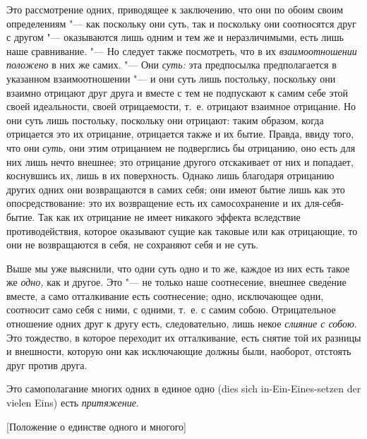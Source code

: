 Это рассмотрение одних, приводящее к заключению, что они по обоим своим
определениям "--- как поскольку они суть, так и поскольку они соотносятся друг
с другом "--- оказываются лишь одним и тем же и неразличимыми, есть лишь наше
сравнивание. "--- Но следует также посмотреть, что в их
{\em взаимоотношении положено} в них же самих. "--- Они
{\em суть:} эта предпосылка предполагается в указанном
взаимоотношении "--- и они суть лишь постольку, поскольку они взаимно отрицают
друг друга и вместе с тем не подпускают к самим себе этой своей
идеальности, своей отрицаемости, т.~е. отрицают взаимное отрицание. Но они
суть лишь постольку, поскольку они отрицают: таким образом, когда
отрицается это их отрицание, отрицается также и их бытие. Правда, ввиду
того, что они {\em суть,} они этим отрицанием не
подверглись бы отрицанию, оно есть для них лишь нечто внешнее; это
отрицание другого отскакивает от них и попадает, коснувшись их, лишь в их
поверхность. Однако лишь благодаря отрицанию других одних они возвращаются
в самих себя; они имеют бытие лишь как это опосредствование: это их
возвращение есть их самосохранение и их для-себя-бытие. Так как их
отрицание не имеет никакого эффекта вследствие противодействия, которое
оказывают сущие как таковые или как отрицающие, то они не возвращаются в
себя, не сохраняют себя и не суть.

Выше мы уже выяснили, что одни суть одно и то же, каждое из них есть такое
же {\em одно,} как и другое. Это "--- не только наше
соотнесение, внешнее свед\'{е}ние вместе, а само отталкивание есть соотнесение;
одно, исключающее одни, соотносит само себя с ними, с одними, т.~е. с самим
собою. Отрицательное отношение одних друг к другу есть, следовательно, лишь
некое {\em слияние с собою}. Это тождество, в которое
переходит их отталкивание, есть снятие той их разницы и внешности, которую
они как исключающие должны были, наоборот, отстоять друг против друга.

Это самополагание многих одних в единое одно (dies sich
in-Ein-Eines-setzen der vielen Eins) есть {\em притяжение}.

%
{[Положение о единстве одного и многого]}

